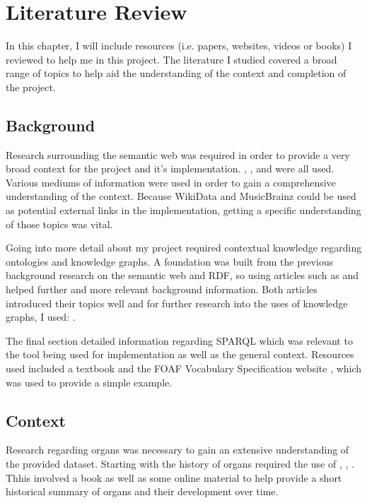 \chapter{Literature Review}
In this chapter, I will include resources (i.e. papers, websites, videos or books) I reviewed to help me in this project. The literature I studied covered a broad range of topics to help aid the understanding of the context and completion of the project.

\section{Background}
\hspace{0.5cm} Research surrounding the semantic web was required in order to provide a very broad context for the project and it's implementation. \cite{berners-TBLBook}, \cite{semanticweb}, \cite{rdf} and \cite{TTL} were all used. Various mediums of information were used in order to gain a comprehensive understanding of the context. Because WikiData \cite{wikidata} and MusicBrainz \cite{musicbrainz} could be used as potential external links in the implementation, getting a specific understanding of those topics was vital. 

Going into more detail about my project required contextual knowledge regarding ontologies and knowledge graphs. A foundation was built from the previous background research on the semantic web and RDF, so using articles such as \cite{ontology} and \cite{knowledgegraph} helped further and more relevant background information. Both articles introduced their topics well and for further research into the uses of knowledge graphs, I used: \cite{searchengine}.   

The final section detailed information regarding SPARQL which was relevant to the tool being used for implementation as well as the general context. Resources used included a textbook\cite{sparlbook} and the FOAF Vocabulary Specification website \cite{foaf}, which was used to provide a simple example. 

\section{Context}
\hspace{0.5cm} Research regarding organs was necessary to gain an extensive understanding of the provided dataset. Starting with the history of organs required the use of \cite{organhistory}, \cite{organhistory1}, \cite{organmedivalhistory}. Thhis involved a book as well as some online material to help provide a short historical summary of organs and their development over time. 

